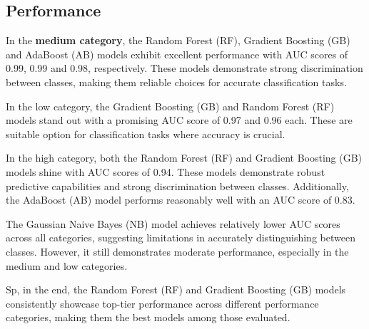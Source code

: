 \subsection{Performance}
In the \textbf{medium category}, the Random Forest (RF), Gradient Boosting (GB) and AdaBoost (AB) models exhibit excellent performance with AUC scores of 0.99, 0.99 and 0.98, respectively. These models demonstrate strong discrimination between classes, making them reliable choices for accurate classification tasks.

In the low category, the Gradient Boosting (GB) and Random Forest (RF) models stand out with a promising AUC score of 0.97 and 0.96 each. These are suitable option for classification tasks where accuracy is crucial.

In the high category, both the Random Forest (RF) and Gradient Boosting (GB) models shine with AUC scores of 0.94. These models demonstrate robust predictive capabilities and strong discrimination between classes. Additionally, the AdaBoost (AB) model performs reasonably well with an AUC score of 0.83.

The Gaussian Naive Bayes (NB) model achieves relatively lower AUC scores across all categories, suggesting limitations in accurately distinguishing between classes. However, it still demonstrates moderate performance, especially in the medium and low categories.

Sp, in the end, the Random Forest (RF) and Gradient Boosting (GB) models consistently showcase top-tier performance across different performance categories, making them the best models among those evaluated.